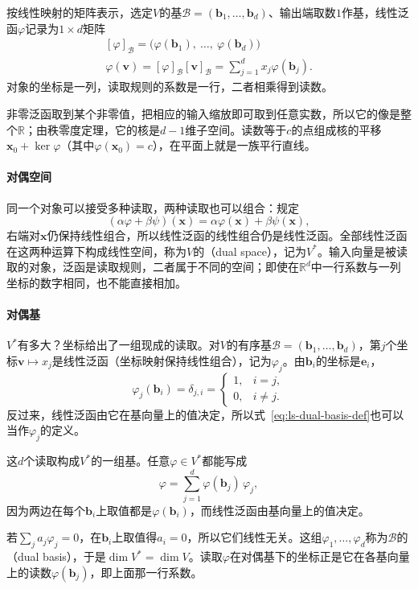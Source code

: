 按线性映射的矩阵表示，选定$V$的基$\mathcal B=(\bm b_1,\ldots,\bm b_d)$、输出端取数$1$作基，线性泛函$\varphi$记录为$1\times d$矩阵
\[
 \begin{gathered}
[\varphi]_{\mathcal B}=\bigl(\varphi(\bm b_1),\ \ldots,\ \varphi(\bm b_d)\bigr)\\
\varphi(\bm v)=[\varphi]_{\mathcal B}[\bm v]_{\mathcal B}=\sum_{j=1}^dx_j\varphi(\bm b_j).
 \end{gathered}
\]
对象的坐标是一列，读取规则的系数是一行，二者相乘得到读数。

非零泛函取到某个非零值，把相应的输入缩放即可取到任意实数，所以它的像是整个$\mathbb R$；由秩零度定理，它的核是$d-1$维子空间。读数等于$c$的点组成核的平移$\bm x_0+\ker\varphi$（其中$\varphi(\bm x_0)=c$），在平面上就是一族平行直线。

\paragraph{对偶空间}
同一个对象可以接受多种读取，两种读取也可以组合：规定
\[
 (\alpha\varphi+\beta\psi)(\bm x)=\alpha\varphi(\bm x)+\beta\psi(\bm x),
\]
右端对$\bm x$仍保持线性组合，所以线性泛函的线性组合仍是线性泛函。全部线性泛函在这两种运算下构成线性空间，称为$V$的（dual space），记为$V^*$。输入向量是被读取的对象，泛函是读取规则，二者属于不同的空间；即使在$\mathbb R^d$中一行系数与一列坐标的数字相同，也不能直接相加。

\paragraph{对偶基}
$V^*$有多大？坐标给出了一组现成的读取。对$V$的有序基$\mathcal B=(\bm b_1,\ldots,\bm b_d)$，第$j$个坐标$\bm v\mapsto x_j$是线性泛函（坐标映射保持线性组合），记为$\varphi_j$。由$\bm b_i$的坐标是$\bm e_i$，
\begin{equation}
 \varphi_j(\bm b_i)=\delta_{j,i}
 =\begin{cases}1,&i=j,\\0,&i\neq j.\end{cases}
 \label{eq:ls-dual-basis-def}
\end{equation}
反过来，线性泛函由它在基向量上的值决定，所以式~\eqref{eq:ls-dual-basis-def}也可以当作$\varphi_j$的定义。

这$d$个读取构成$V^*$的一组基。任意$\varphi\in V^*$都能写成
\[
 \varphi=\sum_{j=1}^d\varphi(\bm b_j)\,\varphi_j,
\]
因为两边在每个$\bm b_i$上取值都是$\varphi(\bm b_i)$，而线性泛函由基向量上的值决定。

若$\sum_ja_j\varphi_j=0$，在$\bm b_i$上取值得$a_i=0$，所以它们线性无关。这组$\varphi_1,\ldots,\varphi_d$称为$\mathcal B$的（dual basis），于是$\dim V^*=\dim V$。读取$\varphi$在对偶基下的坐标正是它在各基向量上的读数$\varphi(\bm b_j)$，即上面那一行系数。

